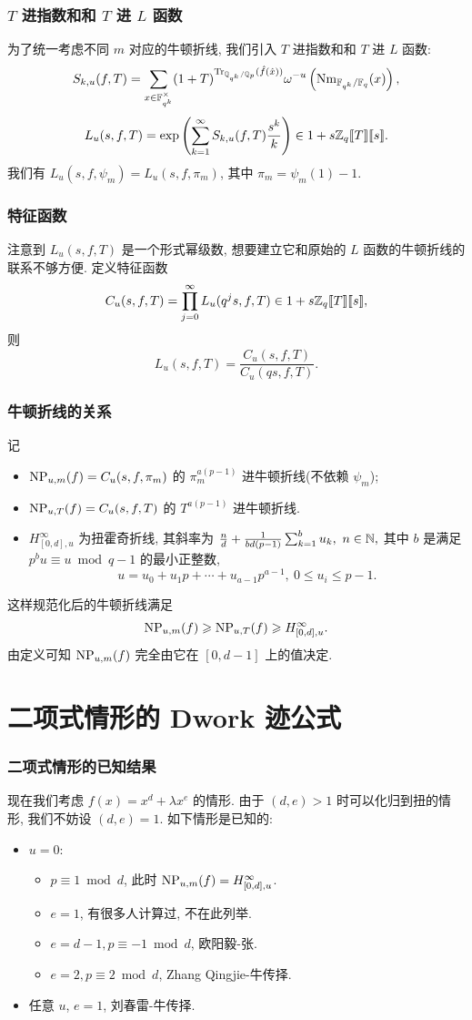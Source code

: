 \documentclass[aspectratio=169,handout]{ctexbeamer}
\newcommand\ldb{\llbracket}
\newcommand\rdb{\rrbracket}
\begin{document}
\begin{frame}
\frametitle{$T$ 进指数和和 $T$ 进 $L$ 函数}
为了统一考虑不同 $m$ 对应的牛顿折线, 我们引入 $T$ 进指数和和 $T$ 进 $L$ 函数:
	\[	S_{k,u}(f,T)=\sum_{x\in{\mathbb{F}}_{q^k}^\times}(1+T)^{{\mathrm{Tr}}_{{\mathbb{Q}}_{q^k}/{\mathbb{Q}}_p}(\hat f(\hat x))}\omega^{-u}\left({\mathrm{Nm}}_{{\mathbb{F}}_{q^k}/{\mathbb{F}}_q}(x)\right), \]
	\[
		L_u(s,f,T)=\exp\left(\sum_{k=1}^\infty S_{k,u}(f,T)\frac{s^k}{k}\right)\in 1+s\BZ_q\ldb T\rdb\ldb s\rdb.
	\]
我们有 $L_u(s,f,\psi_m)=L_u(s,f,\pi_m)$, 其中 $\pi_m=\psi_m(1)-1$.
\end{frame}


\begin{frame}
\frametitle{特征函数}
注意到 $L_u(s,f,T)$ 是一个形式幂级数, 想要建立它和原始的 $L$ 函数的牛顿折线的联系不够方便.
定义特征函数
	\[C_u(s,f,T)=\prod_{j=0}^\infty L_u(q^j s,f,T)\in 1+s\BZ_q\ldb T\rdb\ldb s\rdb,\]
则
	\[	L_u(s,f,T)=\frac{C_u(s,f,T)}{C_u(qs,f,T)}.\]
\end{frame}


\begin{frame}
\frametitle{牛顿折线的关系}
记
\begin{itemize}
\item ${\mathrm{NP}}_{u,m}(f)=C_u(s,f,\pi_m)$ 的 $\pi_m^{a(p-1)}$ 进牛顿折线(不依赖 $\psi_m$);
\item ${\mathrm{NP}}_{u,T}(f)=C_u(s,f,T)$ 的 $T^{a(p-1)}$ 进牛顿折线.
\item $H_{[0,d],u}^\infty$ 为扭霍奇折线, 其斜率为 $\tfrac{n}{d}+\tfrac{1}{bd(p-1)}\sum_{k=1}^b u_k,\ n\in\BN,$
其中 $b$ 是满足 $p^bu\equiv u\bmod{q-1}$ 的最小正整数,
	\[u=u_0+u_1p+\cdots+u_{a-1}p^{a-1},\ 0\le u_i\le p-1.\]
\end{itemize}
这样规范化后的牛顿折线满足
	\[{\mathrm{NP}}_{u,m}(f)\geqslant {\mathrm{NP}}_{u,T}(f)\geqslant H_{[0,d],u}^\infty.\]
由定义可知 ${\mathrm{NP}}_{u,m}(f)$ 完全由它在 $[0,d-1]$ 上的值决定.
\end{frame}


\section{二项式情形的 Dwork 迹公式}

\begin{frame}
\frametitle{二项式情形的已知结果}
现在我们考虑 $f(x)=x^d+\lambda x^e$ 的情形. 由于 $(d,e)>1$ 时可以化归到扭的情形, 我们不妨设 $(d,e)=1$. 如下情形是已知的:
\begin{itemize}
\item $u=0$:
\begin{itemize}
\item $p\equiv 1\bmod d$, 此时 ${\mathrm{NP}}_{u,m}(f)=H_{[0,d],u}^\infty$.
\item $e=1$, 有很多人计算过, 不在此列举.
\item $e=d-1,p\equiv -1\bmod d$, 欧阳毅-张.
\item $e=2,p\equiv 2\bmod d$, Zhang Qingjie-牛传择.
\end{itemize}
\item 任意 $u$, $e=1$, 刘春雷-牛传择.
\end{itemize}
\end{frame}
\end{document}
